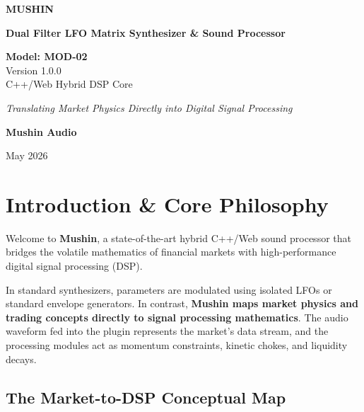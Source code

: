 \documentclass[11pt,a4paper,oneside]{book}
\begin{document}
\begin{titlepage}
    \centering
    \vspace*{2cm}
    {\Huge \textbf{MUSHIN} \par}
    \vspace{0.6cm}
    {\Large \textbf{Dual Filter LFO Matrix Synthesizer \& Sound Processor} \par}
    \vspace{1.5cm}
    \begin{tcolorbox}[colback=dark_bg,colframe=mushin_blue,center,width=12cm,halign=center]
        \color{white}
        \textbf{Model: MOD-02} \\
        \small Version 1.0.0 \\
        \footnotesize C++/Web Hybrid DSP Core
    \end{tcolorbox}
    \vspace{3cm}
    {\large \textit{Translating Market Physics Directly into Digital Signal Processing} \par}
    \vspace{4cm}
    {\large \textbf{Mushin Audio} \par}
    {\small May 2026}
\end{titlepage}

\tableofcontents

\chapter{Introduction \& Core Philosophy}

Welcome to \textbf{Mushin}, a state-of-the-art hybrid C++/Web sound processor that bridges the volatile mathematics of financial markets with high-performance digital signal processing (DSP). 

In standard synthesizers, parameters are modulated using isolated LFOs or standard envelope generators. In contrast, \textbf{Mushin maps market physics and trading concepts directly to signal processing mathematics}. The audio waveform fed into the plugin represents the market's data stream, and the processing modules act as momentum constraints, kinetic chokes, and liquidity decays.

\section{The Market-to-DSP Conceptual Map}
\end{document}
